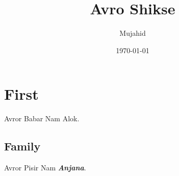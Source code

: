 \documentclass [a4paper, 12pt] {article}
\title{Avro Shikse}
\author{Mujahid}
\date{\today}
\begin{document}
\maketitle

\section{First}
    Avror Babar Nam Alok.
    \subsection{Family}
    Avror Pisir Nam \textbf{\textit{Anjana}}.
\end{document}
